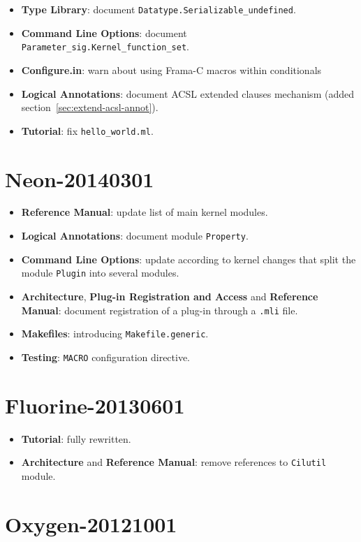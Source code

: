 \begin{itemize}
\item \textbf{Type Library}: document
  \texttt{Datatype.Serializable\_undefined}.
\item \textbf{Command Line Options}: document
  \texttt{Parameter\_sig.Kernel\_function\_set}.
\item \textbf{Configure.in}: warn about using Frama-C macros within conditionals
\item \textbf{Logical Annotations}: document ACSL extended clauses mechanism
  (added section~\ref{sec:extend-acsl-annot}).
\item \textbf{Tutorial}: fix \texttt{hello\_world.ml}.
\end{itemize}

\section*{Neon-20140301}

\begin{itemize}
\item \textbf{Reference Manual}: update list of main kernel modules.
\item \textbf{Logical Annotations}: document module \texttt{Property}.
\item \textbf{Command Line Options}: update according to kernel changes that
  split the module \texttt{Plugin} into several modules.
\item \textbf{Architecture}, \textbf{Plug-in Registration and Access} and
  \textbf{Reference Manual}: document registration of a plug-in through a
  \texttt{.mli} file.
\item \textbf{Makefiles}: introducing \texttt{Makefile.generic}.
\item \textbf{Testing}: \texttt{MACRO} configuration directive.
\end{itemize}

\section*{Fluorine-20130601}

\begin{itemize}
\item \textbf{Tutorial}: fully rewritten.
\item \textbf{Architecture} and \textbf{Reference Manual}: remove references
      to \texttt{Cilutil} module.
\end{itemize}

\section*{Oxygen-20121001}

